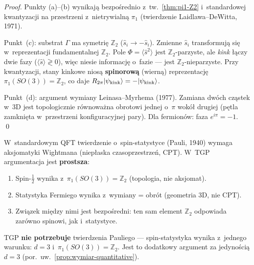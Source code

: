 \begin{proof}
Punkty (a)--(b) wynikaj\k{a} bezpo\'srednio z~tw.~\ref{thm:pi1-Z2}
i~standardowej kwantyzacji na przestrzeni z~nietrywialn\k{a}
$\pi_1$ (twierdzenie Laidlawa--DeWitta, 1971).

Punkt~(c): substrat $\Gamma$ ma symetri\k{e} $\mathbb{Z}_2$
($\hat{s}_i \to -\hat{s}_i$). Zmienne $\hat{s}_i$
transformuj\k{a} si\k{e} w~reprezentacji fundamentalnej
$\mathbb{Z}_2$. Pole $\Phi = \langle\hat{s}^2\rangle$
jest $\mathbb{Z}_2$-parzyste, ale \emph{kink} \l{}\k{a}czy
dwie fazy ($\langle\hat{s}\rangle \gtrless 0$),
wi\k{e}c niesie informacj\k{e} o~fazie ---
jest $\mathbb{Z}_2$-nieparzyste.
Przy kwantyzacji, stany kinkowe nios\k{a}
\textbf{spinorow\k{a}} (wiern\k{a}) reprezentacj\k{e}
$\pi_1(SO(3)) = \mathbb{Z}_2$,
co daje $R_{2\pi}|\psi_{\rm kink}\rangle = -|\psi_{\rm kink}\rangle$.

Punkt~(d): argument wymiany Leinasa--Myrhema (1977).
Zamiana dw\'och cz\k{a}stek w~3D jest topologicznie
r\'ownowa\.zna obrotowi jednej o~$\pi$ wok\'o\l{} drugiej
(p\k{e}tla zamkni\k{e}ta w~przestrzeni konfiguracyjnej
pary). Dla fermion\'ow: faza $e^{i\pi} = -1$.
\qed
\end{proof}

\begin{remark}%
\label{rem:spin-stats-TGP}
W~standardowym QFT twierdzenie o~spin-statystyce
(Pauli, 1940) wymaga aksjomatyki Wightmana
(niep\l{}aska czasoprzestrze\'n, CPT).
W~TGP argumentacja jest \textbf{prostsza}:
\begin{enumerate}[nosep]
  \item Spin-$\tfrac{1}{2}$ wynika z~$\pi_1(SO(3)) = \mathbb{Z}_2$
        (topologia, nie aksjomat).
  \item Statystyka Fermiego wynika z~wymiany = obr\'ot
        (geometria 3D, nie CPT).
  \item Zwi\k{a}zek mi\k{e}dzy nimi jest bezpo\'sredni:
        ten sam element $\mathbb{Z}_2$ odpowiada
        zar\'owno spinowi, jak i~statystyce.
\end{enumerate}
TGP \textbf{nie potrzebuje} twierdzenia Pauliego ---
spin-statystyka wynika z~jednego warunku: $d = 3$
i~$\pi_1(SO(3)) = \mathbb{Z}_2$.
Jest to dodatkowy argument za jedyno\'sci\k{a}
$d = 3$ (por.\ uw.~\ref{prop:wymiar-quantitative}).
\end{remark}

